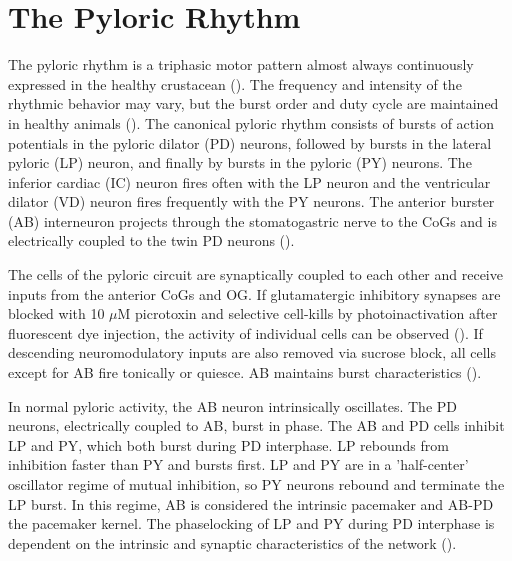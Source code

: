 \documentclass[14pt]{article}
\begin{document}
	\section{The Pyloric Rhythm}
	The pyloric rhythm is a triphasic motor pattern almost always continuously expressed in the healthy crustacean (\cite{ClemensLongtermexpressiontwo1998,RezerExpressioncrustaceanpyloric1983}). The frequency and intensity of the rhythmic behavior may vary, but the burst order and duty cycle are maintained in healthy animals (\cite{MarderUnderstandingCircuitDynamics2007}). The canonical pyloric rhythm consists of bursts of action potentials in the pyloric dilator (PD) neurons, followed by bursts in the lateral pyloric (LP) neuron, and finally by bursts in the pyloric (PY) neurons. The inferior cardiac (IC) neuron fires often with the LP neuron and the ventricular dilator (VD) neuron fires frequently with the PY neurons. The anterior burster (AB) interneuron projects through the stomatogastric nerve to the CoGs and is electrically coupled to the twin PD neurons (\cite{Harris-WarrickDynamicBiologicalNetworks1992}).
	
	The cells of the pyloric circuit are synaptically coupled to each other and receive inputs from the anterior CoGs and OG. If glutamatergic inhibitory synapses are blocked with 10 $\mu$M picrotoxin and selective cell-kills by photoinactivation after fluorescent dye injection, the activity of individual cells can be observed (\cite{EisenMechanismsunderlyingpattern1982,JuurlinkNeuralCellSpecification2012}). If descending neuromodulatory inputs are also removed via sucrose block, all cells except for AB fire tonically or quiesce. AB maintains burst characteristics (\cite{SelverstonCrustaceanStomatogastricSystem1987,HooperModulationlobsterpyloric1987,Harris-WarrickDynamicBiologicalNetworks1992}).
	
	In normal pyloric activity, the AB neuron intrinsically oscillates. The PD neurons, electrically coupled to AB, burst in phase. The AB and PD cells inhibit LP and PY, which both burst during PD interphase. LP rebounds from inhibition faster than PY and bursts first. LP and PY are in a 'half-center' oscillator regime of mutual inhibition, so PY neurons rebound and terminate the LP burst.  In this regime, AB is considered the intrinsic pacemaker and AB-PD the pacemaker kernel. The phaselocking of LP and PY during PD interphase is dependent on the intrinsic and synaptic characteristics of the network (\cite{HooperModulationlobsterpyloric1987,HartlinePatterngenerationlobster1979}).
	
\end{document}
